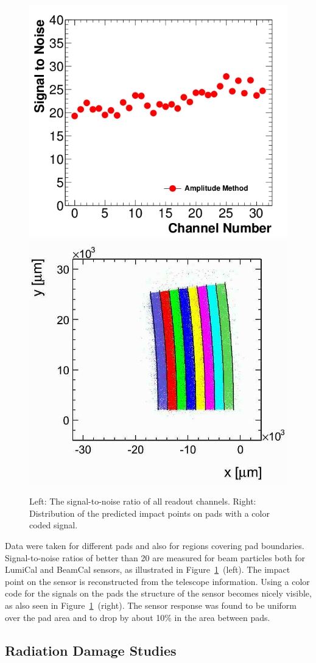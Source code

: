 \begin{figure}[htpb]
\centering
  \includegraphics[width=0.45\columnwidth]{Calorimeter/FCAL/figs/StoN_AmplitudeMethod_TB11} \hfill
  \includegraphics[width=0.45\columnwidth]{Calorimeter/FCAL/figs/hit_map_area1}
  \caption{Left: The signal-to-noise ratio of all readout channels.
          Right: Distribution of the predicted impact points on pads with a color coded signal.}
\label{fig:sinalnoise}
\end{figure}
Data were taken for different pads and also for regions covering pad boundaries.
Signal-to-noise ratios
of better than 20 are measured for beam particles both for LumiCal and BeamCal sensors,
as illustrated in Figure~\ref{fig:sinalnoise}~(left).
The impact point on the sensor is reconstructed from the telescope information.
Using a color code for the signals on the pads
the structure of the sensor becomes nicely visible, as also seen in Figure~\ref{fig:sinalnoise}~(right).
The sensor response was found to be uniform over the pad area and to drop by about 10\% in the
area between pads.

\subsection{Radiation Damage Studies}


